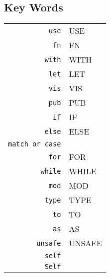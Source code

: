 \documentclass{article}
\begin{document}
		\subsection{Key Words}
			\begin{tabular}{rl}
				\texttt{use} & USE\\
				\texttt{fn} & FN\\
				\texttt{with} & WITH\\
				\texttt{let} & LET\\
				\texttt{vis} & VIS\\
				\texttt{pub} & PUB\\
				\texttt{if} & IF\\
				\texttt{else} & ELSE\\ 
				\texttt{match or case} & \\
				\texttt{for} & FOR\\
				\texttt{while} & WHILE\\
				\texttt{mod} & MOD\\
				\texttt{type} & TYPE \\
				\texttt{to} & TO\\
				\texttt{as} & AS\\
				\texttt{unsafe} & UNSAFE\\
				\texttt{self} & \\
				\texttt{Self} & \\
			\end{tabular}
\end{document}
